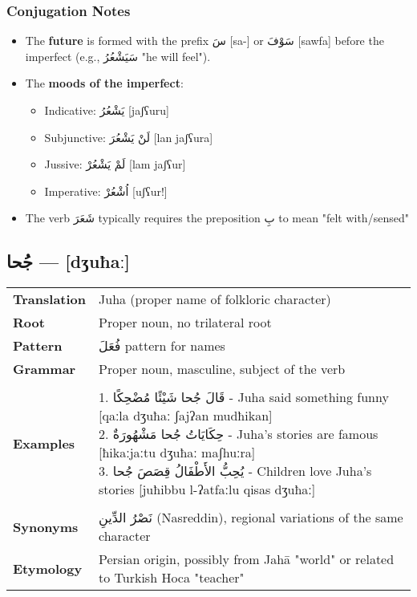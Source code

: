 \documentclass[letterpaper,12pt]{article}
\begin{document}
\subsubsection*{Conjugation Notes}
\begin{itemize}
  \item The \textbf{future} is formed with the prefix \textarabic{سَ} [sa-] or \textarabic{سَوْفَ} [sawfa] before the imperfect (e.g., \textarabic{سَيَشْعُرُ} "he will feel").
  \item The \textbf{moods of the imperfect}:
    \begin{itemize}
      \item Indicative: \textarabic{يَشْعُرُ} [jaʃʕuru]
      \item Subjunctive: \textarabic{لَنْ يَشْعُرَ} [lan jaʃʕura]
      \item Jussive: \textarabic{لَمْ يَشْعُرْ} [lam jaʃʕur]
      \item Imperative: \textarabic{اُشْعُرْ} [uʃʕur!]
    \end{itemize}
  \item The verb \textarabic{شَعَرَ} typically requires the preposition \textarabic{بِ} to mean "felt with/sensed"
\end{itemize}

\subsection{\textarabic{جُحا} — [dʒuħaː]}
\begin{tabular}{p{3cm}p{10cm}}
\toprule
\textbf{Translation} & Juha (proper name of folkloric character) \\
\textbf{Root} & Proper noun, no trilateral root \\
\textbf{Pattern} & \textarabic{فُعَلَ} pattern for names \\
\textbf{Grammar} & Proper noun, masculine, subject of the verb \\
\midrule \\
\textbf{Examples} & \makecell[l]{\parbox{9.5cm}{
1. \textarabic{قَالَ جُحا شَيْئًا مُضْحِكًا} - Juha said something funny [qaːla dʒuħaː ʃajʔan mudħikan]\\
2. \textarabic{حِكَايَاتُ جُحا مَشْهُورَةٌ} - Juha's stories are famous [ħikaːjaːtu dʒuħaː maʃhuːra]\\
3. \textarabic{يُحِبُّ الأَطْفَالُ قِصَصَ جُحا} - Children love Juha's stories [juħibbu l-ʔatfaːlu qisas dʒuħaː]
}} \\
\midrule \\
\textbf{Synonyms} & \textarabic{نَصْرُ الدِّينِ} (Nasreddin), regional variations of the same character \\
\textbf{Etymology} & Persian origin, possibly from Jahā "world" or related to Turkish Hoca "teacher" \\
\bottomrule
\end{tabular}
\end{document}
